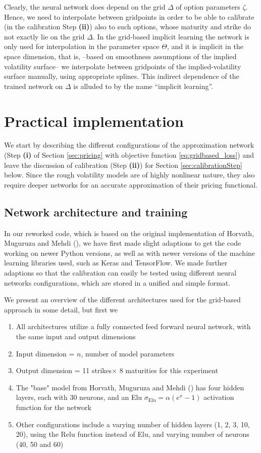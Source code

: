 \documentclass{article}
\theoremstyle{remark}
\begin{document}
Clearly, the neural network does depend on the grid $\Delta$ of option
parameters $\zeta$. Hence, we need to interpolate between gridpoints in order to be able to calibrate (in the calibration Step \textbf{(ii)}) also to such options, whose
maturity and strike do not exactly lie on the grid $\Delta$. 
In the grid-based implicit learning the network is only used for interpolation in the parameter space $\Theta$,
and it is implicit in the space dimension, that is,
--based on smoothness assumptions of the implied volatility surface--
we interpolate between gridpoints of the implied-volatility surface manually, using appropriate splines.
This indirect dependence of the trained network on $\Delta$ is alluded to by the name ``implicit learning''.

\section{Practical implementation}
\label{sec:implementation}
We start by describing the different configurations of the approximation network (Step \textbf{(i)} 
of Section \ref{sec:pricing} with objective function \eqref{eq:gridbased_loss})
and leave the discussion of calibration (Step \textbf{(ii)}) for Section \ref{sec:calibrationStep} below.
Since the rough volatility models are of highly nonlinear nature,
they also require deeper networks for an accurate approximation of their pricing functional.

\subsection{Network architecture and training}
\label{sec:architecture}
In our reworked code, which is based on the original implementation of Horvath, Muguruza and Mehdi (\cite{HMM19}),
we have first made slight adaptions to get the code working on newer Python versions,
as well as with newer versions of the machine learning libraries used, such as Keras and TensorFlow.
We made further adaptions so that the calibration can easily be tested using different neural networks configurations,
which are stored in a unified and simple format.

We present an overview of the different architectures used for the grid-based approach in some detail, but first we 
\begin{enumerate}
\item All architectures utilize a fully connected feed forward neural network, with the same input and output dimensions
\item Input dimension = $n$, number of  model parameters
\item Output dimension = 11 strikes$\times$ 8 maturities for this experiment
\item The "base" model from Horvath, Muguruza and Mehdi (\cite{HMM19}) has four hidden layers, each with 30 neurons, and an Elu $\sigma_{\mathrm{Elu}}=\alpha(e^x-1)$ activation
  function for the network
\item Other configurations include a varying number of hidden layers (1, 2, 3, 10, 20), using the Relu function instead of Elu, and varying number of neurons (40, 50 and 60)
\end{enumerate}
\end{document}
